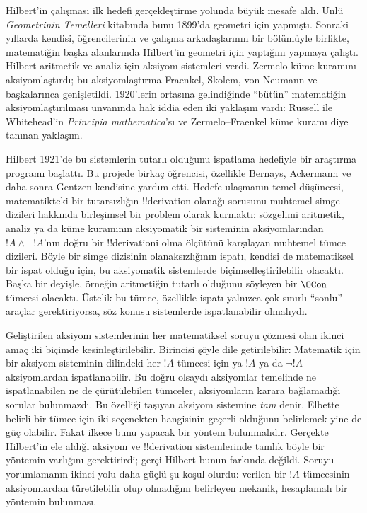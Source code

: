 Hilbert'in çalışması ilk hedefi gerçekleştirme yolunda büyük mesafe aldı.
Ünlü \emph{Geometrinin Temelleri} kitabında bunu 1899'da geometri için
yapmıştı. Sonraki yıllarda kendisi, öğrencilerinin ve çalışma arkadaşlarının
bir bölümüyle birlikte, matematiğin başka alanlarında Hilbert'in geometri
için yaptığını yapmaya çalıştı. Hilbert aritmetik ve analiz için aksiyom
sistemleri verdi. Zermelo küme kuramını aksiyomlaştırdı; bu aksiyomlaştırma
Fraenkel, Skolem, von Neumann ve başkalarınca genişletildi. 1920'lerin
ortasına gelindiğinde ``bütün'' matematiğin aksiyomlaştırılması unvanında hak
iddia eden iki yaklaşım vardı: Russell ile Whitehead'in \emph{Principia
mathematica}'sı ve Zermelo--Fraenkel küme kuramı diye tanınan yaklaşım.

Hilbert 1921'de bu sistemlerin tutarlı olduğunu ispatlama hedefiyle bir
araştırma programı başlattı. Bu projede birkaç öğrencisi, özellikle Bernays,
Ackermann ve daha sonra Gentzen kendisine yardım etti. Hedefe ulaşmanın
temel düşüncesi, matematikteki bir tutarsızlığın !!{derivation} olanağı
sorusunu muhtemel simge dizileri hakkında birleşimsel bir problem olarak
kurmaktı: sözgelimi aritmetik, analiz ya da küme kuramının aksiyomatik bir
sisteminin aksiyomlarından $!A \land \lnot !A$'nın doğru bir
!!{derivation}{}i olma ölçütünü karşılayan muhtemel tümce dizileri. Böyle bir
simge dizisinin olanaksızlığının ispatı, kendisi de matematiksel bir ispat
olduğu için, bu aksiyomatik sistemlerde biçimselleştirilebilir olacaktı.
Başka bir deyişle, örneğin aritmetiğin tutarlı olduğunu söyleyen bir
$\OCon$ tümcesi olacaktı. Üstelik bu tümce, özellikle ispatı yalnızca çok
sınırlı ``sonlu'' araçlar gerektiriyorsa, söz konusu sistemlerde
ispatlanabilir olmalıydı.

Geliştirilen aksiyom sistemlerinin her matematiksel soruyu çözmesi olan
ikinci amaç iki biçimde kesinleştirilebilir. Birincisi şöyle dile
getirilebilir: Matematik için bir aksiyom sisteminin dilindeki her $!A$
tümcesi için ya $!A$ ya da $\lnot !A$ aksiyomlardan ispatlanabilir. Bu doğru
olsaydı aksiyomlar temelinde ne ispatlanabilen ne de çürütülebilen tümceler,
aksiyomların karara bağlamadığı sorular bulunmazdı. Bu özelliği taşıyan
aksiyom sistemine \emph{tam} denir. Elbette belirli bir tümce için iki
seçenekten hangisinin geçerli olduğunu belirlemek yine de güç olabilir.
Fakat ilkece bunu yapacak bir yöntem bulunmalıdır. Gerçekte Hilbert'in ele
aldığı aksiyom ve !!{derivation} sistemlerinde tamlık böyle bir yöntemin
varlığını gerektirirdi; gerçi Hilbert bunun farkında değildi. Soruyu
yorumlamanın ikinci yolu daha güçlü şu koşul olurdu: verilen bir $!A$
tümcesinin aksiyomlardan türetilebilir olup olmadığını belirleyen mekanik,
hesaplamalı bir yöntemin bulunması.


